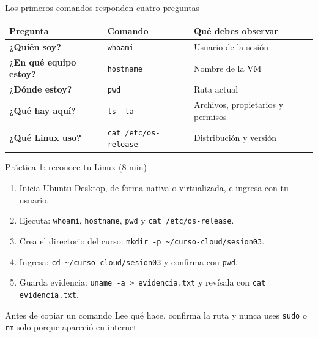 \documentclass[aspectratio=169,10pt,c]{beamer}
\begin{document}
\begin{frame}{Los primeros comandos responden cuatro preguntas}
\begin{center}
\small
\begin{tabular}{>{\bfseries}p{3.2cm}p{3.0cm}p{4.4cm}}
\toprule
Pregunta & Comando & Qué debes observar \\
\midrule
¿Quién soy? & \texttt{whoami} & Usuario de la sesión \\
¿En qué equipo estoy? & \texttt{hostname} & Nombre de la VM \\
¿Dónde estoy? & \texttt{pwd} & Ruta actual \\
¿Qué hay aquí? & \texttt{ls -la} & Archivos, propietarios y permisos \\
¿Qué Linux uso? & \texttt{cat /etc/os-release} & Distribución y versión \\
\bottomrule
\end{tabular}
\end{center}
\end{frame}

\begin{frame}{Práctica 1: reconoce tu Linux \textnormal{\small(8 min)}}
\begin{enumerate}\setlength\itemsep{6pt}\small
  \item Inicia Ubuntu Desktop, de forma nativa o virtualizada, e ingresa con tu usuario.
  \item Ejecuta: \texttt{whoami}, \texttt{hostname}, \texttt{pwd} y \texttt{cat /etc/os-release}.
  \item Crea el directorio del curso: \texttt{mkdir -p \textasciitilde/curso-cloud/sesion03}.
  \item Ingresa: \texttt{cd \textasciitilde/curso-cloud/sesion03} y confirma con \texttt{pwd}.
  \item Guarda evidencia: \texttt{uname -a > evidencia.txt} y revísala con \texttt{cat evidencia.txt}.
\end{enumerate}
\begin{alertblock}{Antes de copiar un comando}
\small Lee qué hace, confirma la ruta y nunca uses \texttt{sudo} o \texttt{rm} solo porque apareció en internet.
\end{alertblock}
\end{frame}
\end{document}
